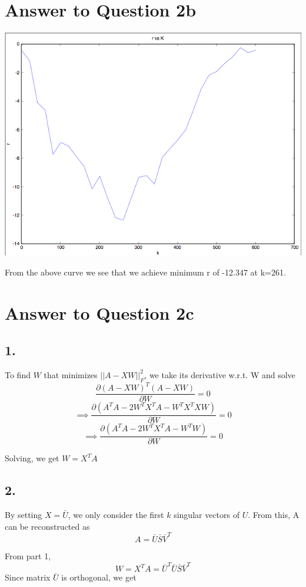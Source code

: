 \documentclass[11pt]{article}
\begin{document}
{\section*{Answer to Question 2b}
\includegraphics[scale=0.8]{q2err}

From the above curve we see that we achieve minimum r of -12.347 at k=261.

\pagebreak[4]
\section*{Answer to Question 2c}

\subsection*{1.}
To find $W$ that minimizes $||A-XW||_F^2$, we take its derivative w.r.t. W and solve
$$ \frac{\partial (A-XW)^T(A-XW)}{\partial W} = 0 $$
$$ \implies \frac{\partial (A^TA-2W^TX^TA-W^TX^TXW)}{\partial W} = 0 $$
$$ \implies \frac{\partial (A^TA-2W^TX^TA-W^TW)}{\partial W} = 0 $$

Solving, we get $W = X^T A$

\subsection*{2.}
By setting $X = \bar{U}$, we only consider the first $k$ singular vectors of $U$. From this, A can be reconstructed as 
$$A = \bar{U}\bar{S}\bar{V}^T$$

From part 1,
$$W = X^T A = \bar{U}^T \bar{U}\bar{S}\bar{V}^T$$
Since matrix $\bar{U}$ is orthogonal, we get

}
\end{document}
